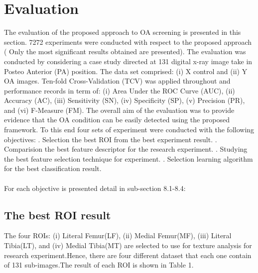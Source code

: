 \documentclass[review]{elsarticle}
\begin{document}
\section{Evaluation}
The evaluation of the proposed approach to OA screening is presented in this section. 7272 experiments were conducted with respect to the proposed approach ( Only the most significant results obtained are presented). The evaluation was conducted by considering a case study directed at 131 digital x-ray image take in Posteo Anterior (PA) position. The data set comprised: (i) X control and (ii) Y OA images. Ten-fold Cross-Validation (TCV) was applied throughout and performance records in term of: (i) Area Under the ROC Curve (AUC), (ii) Accuracy (AC), (iii) Sensitivity (SN), (iv) Specificity (SP), (v) Precision (PR), and (vi) F-Measure (FM). The overall aim of the evaluation was to provide evidence that the OA condition can be easily detected using the proposed framework. To this end four sets of experiment were conducted with the following objectives:
. Selection the best ROI from the best experiment result. 
. Comparision the best feature descriptor for the research experiment. 
. Studying the best feature selection technique for experiment.
. Selection learning algorithm for the best classification result. \\ \\
For each objective is presented detail in sub-section 8.1-8.4: 

\subsection{The best ROI result}
The four ROIs: (i) Literal Femur(LF), (ii) Medial Femur(MF), (iii) Literal Tibia(LT), and (iv) Medial Tibia(MT) are selected to use for texture analysis for research experiment.Hence, there are four different dataset that each one contain of 131 sub-images.The result of each ROI is shown in Table 1.\\
\end{document}
